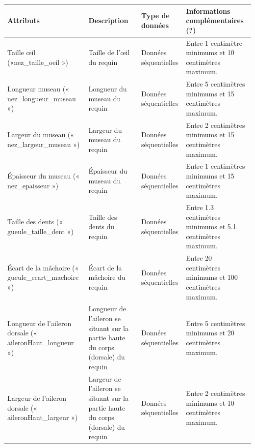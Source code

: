 \documentclass{article}
\begin{document}
\begin{longtable}[h]{|p{} | p{}|p{}|p{}|}
	\hline
	Attributs                                                            & Description                                                                       & Type de données       & Informations complémentaires (?)                           \\ \hline
	Taille œil («nez\_taille\_oeil »)                                    & Taille de l’œil du requin                                                         & Données séquentielles & Entre 1 centimètre minimums et 10 centimètres maximum.     \\ \hline
	Longueur museau (« nez\_longueur\_museau »)                          & Longueur du museau du requin                                                      & Données séquentielles & Entre 5 centimètres minimums et 15 centimètres maximum.    \\ \hline
	Largeur du museau (« nez\_largeur\_museau »)                         & Largeur du museau du requin                                                       & Données séquentielles & Entre 2 centimètres minimums et 15 centimètres maximum.    \\ \hline
	Épaisseur du museau (« nez\_epaisseur »)                             & Épaisseur du museau du requin                                                     & Données séquentielles & Entre 1 centimètres minimums et 15 centimètres maximum.    \\ \hline
	Taille des dents (« gueule\_taille\_dent »)                          & Taille des dents du requin                                                        & Données séquentielles & Entre 1.3 centimètres minimums et 5.1 centimètres maximum. \\ \hline
	Écart de la mâchoire (« gueule\_ecart\_machoire »)                   & Écart de la mâchoire du requin                                                    & Données séquentielles & Entre 20 centimètres minimums et 100 centimètres maximum.  \\ \hline
	Longueur de l’aileron dorsale (« aileronHaut\_longueur »)            & Longueur de l’aileron se situant sur la partie haute du corps (dorsale) du requin & Données séquentielles & Entre 5 centimètres minimums et 20 centimètres maximum.    \\ \hline
	Largeur de l’aileron dorsale (« aileronHaut\_largeur »)              & Largeur de l’aileron se situant sur la partie haute du corps (dorsale) du requin  & Données séquentielles & Entre 2 centimètres minimums et 10 centimètres maximum.    \\ \hline

\end{longtable}
\end{document}
